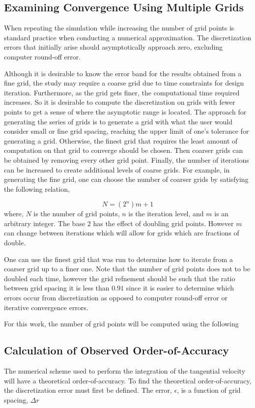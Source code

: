 \subsection{Examining Convergence Using Multiple Grids}
When repeating the simulation while increasing the number of grid points is standard 
practice when conducting a numerical approximation. The discretization errors that
initially arise should asymptotically approach zero, excluding computer round-off error. 

Although it is desirable to know the error band for the results obtained from a 
fine grid, the study may require a coarse grid due to time constraints for design
iteration. Furthermore, as the grid gets finer, the computational time required 
increases. So it is desirable to compute the discretization on grids with fewer points
to get a sense of where the asymptotic range is located. The approach for generating
the series of grids is to generate a grid with what the user would consider small or
fine grid spacing, reaching the upper limit of one's tolerance for generating a grid. Otherwise, the finest grid that requires the least amount of computation on that grid to converge should be chosen. Then coarser grids can be obtained by removing every other grid point. Finally, the
number of iterations can be increased to create additional levels of coarse grids.
For example, in generating the fine grid, one can choose the number of coarser grids
by satisfying the following relation,

\begin{equation}
    N = (2^n)m + 1
\end{equation}
where, $N$ is the number of grid points, $n$ is the iteration level, and $m$ is 
an arbitrary integer. The base $2$ has the effect of doubling grid points. However
$m$ can change between iterations which will allow for grids which are fractions of double.

One can use the finest grid that was run to determine how to iterate from a coarser
grid up to a finer one. Note that the number of grid points does not to be doubled
each time, however the grid refnement should be such that the ratio between grid spacing 
it is less than $0.91$ since it is easier to determine which errors occur from
discretization as opposed to computer round-off error or iterative convergence 
errors.  

For this work, the number of grid points will be computed using the following 
\subsection{Calculation of Observed Order-of-Accuracy}
The numerical scheme used to perform the integration of the tangential velocity
will have a theoretical order-of-accuracy. To find the theoretical 
order-of-accuracy, the discretization error must first be defined. The error, 
$\epsilon$, is a function of grid spacing, $\Delta r$

